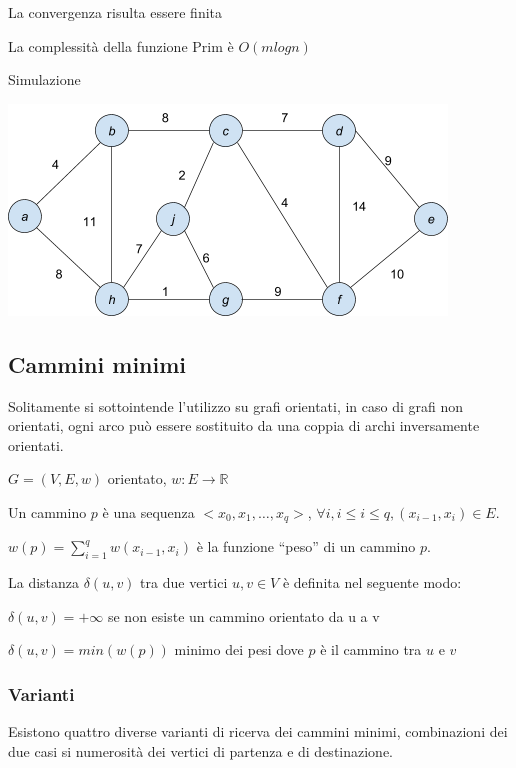 \documentclass[tikz]{article}
\begin{document}
{{La convergenza risulta essere finita

La complessità della funzione Prim è $O(m logn)$

{Simulazione}

{\includegraphics{images/image542.png}}

\subsection{Cammini minimi}

{Solitamente si sottointende l'utilizzo su grafi orientati, in caso di grafi non orientati, ogni arco può essere sostituito da una coppia di archi inversamente orientati.}

$G=(V,E,w)$ orientato, $w:E\rightarrow \mathbb{R}$

Un cammino $p$ è una sequenza $<x_0,x_1,\ldots,x_q>$, $\forall i, i\leq i \leq q, (x_{i-1},x_i) \in E$.

$w(p)=\sum_{i=1}^{q} w(x_{i-1},x_i)$ è la funzione ``peso'' di un cammino $p$.

{La distanza $\delta(u,v)$ tra due vertici $u,v \in V$ è definita nel seguente modo:}

{$\delta(u,v) = +\infty$ se non esiste un cammino orientato da u a v}

{$\delta(u,v)=min(w(p))$ minimo dei pesi dove $p$ è il cammino tra $u$ e $v$}

\subsubsection{Varianti}

{Esistono quattro diverse varianti di ricerva dei cammini minimi, combinazioni dei due casi si numerosità dei vertici di partenza e di destinazione.}

}}
\end{document}
